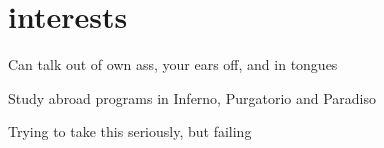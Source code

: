 \documentclass{resume}
\begin{document}
\section{interests}
	\begin{compactitem}
		\item
			Can talk out of own ass, your ears off, and in tongues
		\item
			Study abroad programs in Inferno, Purgatorio and Paradiso
		\item
			Trying to take this seriously, but failing
	\end{compactitem}
%
\end{document}
